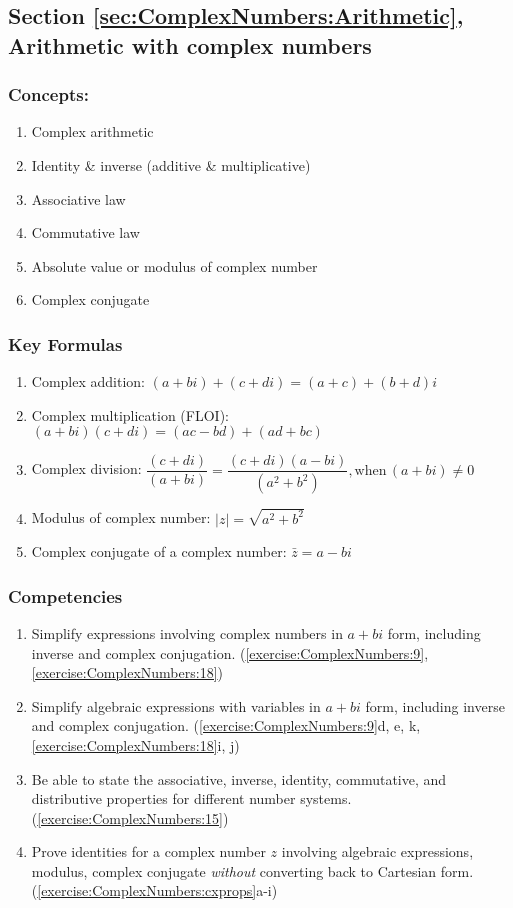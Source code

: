 \subsection*{Section \ref{sec:ComplexNumbers:Arithmetic}, Arithmetic with complex numbers}
\subsubsection*{Concepts:}
\begin{enumerate}
\item 
Complex arithmetic
\item 
Identity \& inverse (additive \& multiplicative)
\item 
Associative law
\item 
Commutative law
\item 
Absolute value or modulus of complex number
\item 
Complex conjugate
\end{enumerate}

\subsubsection*{Key Formulas}
\begin{enumerate}
\item 
Complex addition: $(a + bi) + (c + di) = (a + c) + (b + d)i$
\item 
Complex multiplication (FLOI): $(a + bi)(c + di) = (ac - bd) + (ad + bc)$
\item 
Complex division: $\dfrac{(c + di)}{(a + bi)} = \dfrac{(c + di)(a - bi)}{(a^{2} +  b^{2})}, \text{when}\, (a + bi) \ne 0$
\item 
Modulus of complex number: $\mid z \mid = \sqrt{a^{2} + b^{2}}$
\item 
Complex conjugate of a complex number: $\bar{z} = a - bi$
\end{enumerate}

\subsubsection*{Competencies}
\begin{enumerate}
\item
Simplify expressions involving complex numbers in $a+bi$ form, including inverse and complex conjugation. (\ref{exercise:ComplexNumbers:9}, \ref{exercise:ComplexNumbers:18})
\item
Simplify algebraic expressions with variables in $a+bi$ form, including inverse and complex conjugation. (\ref{exercise:ComplexNumbers:9}d, e, k, \ref{exercise:ComplexNumbers:18}i, j)
\item
Be able to state the associative, inverse, identity, commutative, and distributive properties for different number systems. (\ref{exercise:ComplexNumbers:15})
\item
Prove identities for a complex number $z$ involving algebraic expressions, modulus, complex conjugate \emph{without} converting back to Cartesian form. (\ref{exercise:ComplexNumbers:cxprops}a-i)
\end{enumerate}


